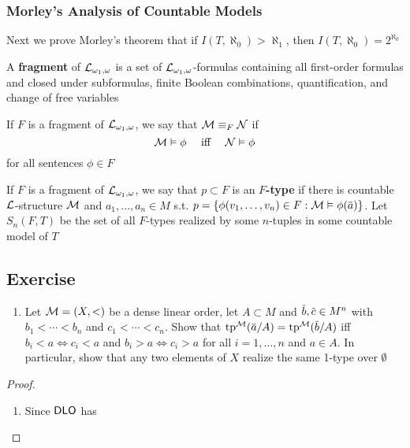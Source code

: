 \documentclass[11pt]{article}
\begin{document}
\subsubsection{Morley's Analysis of Countable Models}
\label{sec:orgdf2e5bf}
Next we prove Morley's theorem that if \(I(T,\aleph_0)>\aleph_1\), then \(I(T,\aleph_0)=2^{\aleph_0}\)
\begin{definition}[]
A \textbf{fragment} of \(\mathcal{L}_{\omega_1,\omega}\) is a set of \(\mathcal{L}_{\omega_1,\omega}\)-formulas containing all first-order formulas
and closed under subformulas, finite Boolean combinations, quantification, and change of free
variables

If \(F\) is a fragment of \(\mathcal{L}_{\omega_1,\omega}\), we say that \(\mathcal{M}\equiv_F\mathcal{N}\) if
\begin{equation*}
\mathcal{M}\vDash\phi \quad\text{ iff }\quad\mathcal{N}\vDash\phi
\end{equation*}
for all sentences \(\phi\in F\)

If \(F\) is a fragment of \(\mathcal{L}_{\omega_1,\omega}\), we say that \(p\subset F\) is an \textbf{\(F\)-type} if there is
countable \(\mathcal{L}\)-structure \(\mathcal{M}\) and \(a_1,\dots,a_n\in M\) s.t. \(p=\{\phi(v_1,\dots,v_n)\in F:\calm\vDash\phi(\bara)\}\).
Let \(S_n(F,T)\) be the set of all \(F\)-types realized by some \(n\)-tuples in some countable
model of \(T\)
\end{definition}

\subsection{Exercise}
\label{sec:orgee12795}
\begin{exercise}
\label{ex4.5.1}
\begin{enumerate}
\item Let \(\mathcal{M}=(X,<)\) be a dense linear order, let \(A\subset M\) and \(\barb,\barc\in M^n\)
with \(b_1<\cdots<b_n\) and \(c_1<\cdots<c_n\). Show that \(\tp^{\calm}(\bara/A)=\tp^{\calm}(\barb/A)\)
iff \(b_i<a\Leftrightarrow c_i<a\)  and \(b_i>a\Leftrightarrow c_i>a\) for all \(i=1,\dots,n\) and \(a\in A\). In particular, show
that any two elements of \(X\) realize the same 1-type over \(\emptyset\)
\end{enumerate}
\end{exercise}

\begin{proof}
\begin{enumerate}
\item Since \(\operatorname{\textsf{DLO}}\) has
\end{enumerate}
\end{proof}
\end{document}
